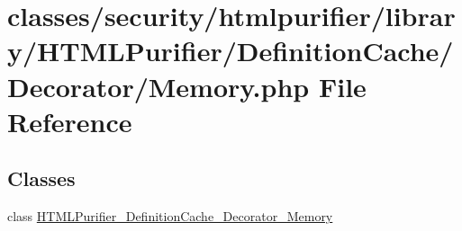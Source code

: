 \hypertarget{Memory_8php}{\section{classes/security/htmlpurifier/library/\+H\+T\+M\+L\+Purifier/\+Definition\+Cache/\+Decorator/\+Memory.php File Reference}
\label{Memory_8php}
}
\subsection*{Classes}
\begin{DoxyCompactItemize}
\item 
class \hyperlink{classHTMLPurifier__DefinitionCache__Decorator__Memory}{H\+T\+M\+L\+Purifier\+\_\+\+Definition\+Cache\+\_\+\+Decorator\+\_\+\+Memory}
\end{DoxyCompactItemize}
